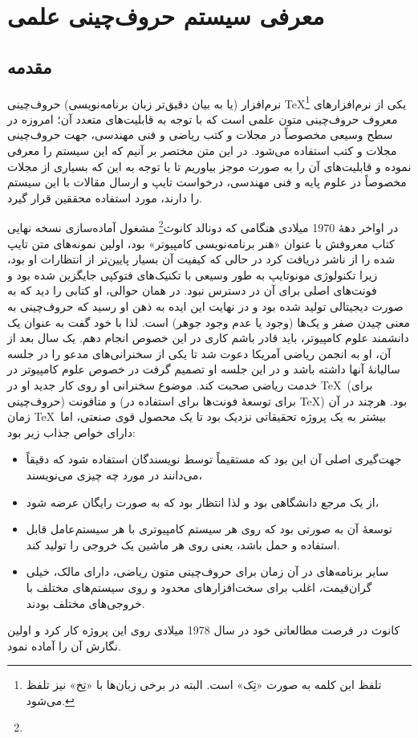 \chapter{معرفی سیستم حروف‌چینی علمی  \lr{\TeX}}
\section{مقدمه}
نرم‌افزار  (یا به بیان دقیق‌تر زبان برنامه‌نویسی) حروف‌چینی \TeX\footnote{تلفظ این کلمه به صورت «تِک» است. البته
در برخی زبان‌ها با «تِخ» نیز تلفظ می‌شود.}
یکی از نرم‌افزارهای معروف 
حروف‌چینی متون علمی است
که با توجه به قابلیت‌های متعدد آن؛ امروزه در سطح وسیعی مخصوصاً در مجلات و کتب ریاضی و فنی مهندسی، 
جهت حروف‌چینی  مجلات و کتب استفاده می‌شود.
 در این متن مختصر بر آنیم
که این سیستم را معرفی نموده و قابلیت‌های آن را به صورت موجز بیاوریم تا با توجه به این که بسیاری از مجلات
مخصوصاً در علوم پایه و فنی مهندسی، درخواست تایپ و ارسال مقالات با این سیستم را دارند، مورد استفاده 
محققین قرار گیرد.

در اواخر دهۀ 1970 میلادی هنگامی که دونالد کانوث\footnote{}
مشغول آماده‌سازی نسخه نهایی کتاب معروفش با عنوان «هنر برنامه‌نویسی کامپیوتر»
بود، اولین نمونه‌های متن تایپ شده را از ناشر دریافت کرد در حالی که کیفیت 
آن بسیار پایین‌تر از انتظارات او بود، زیرا تکنولوژی مونوتایپ 
به طور وسیعی با تکنیک‌های فتوکپی جایگزین شده بود و فونت‌های 
اصلی برای آن در دسترس نبود. در همان حوالی، او کتابی را دید که به صورت دیجیتالی
تولید شده بود و در نهایت این ایده به ذهن او رسید که حروف‌چینی به معنی چیدن صفر و
یک‌ها  (وجود یا عدم وجود جوهر)  است. لذا با خود گفت به عنوان یک دانشمند
علوم کامپیوتر، باید قادر باشم کاری در این خصوص انجام دهم. یک سال بعد از آن، او 
به انجمن ریاضی آمریکا دعوت شد تا یکی از سخنرانی‌های مدعو را در جلسه سالیانۀ
آنها داشته باشد و در این جلسه او تصمیم گرفت در خصوص علوم کامپیوتر در خدمت ریاضی
صحبت کند. موضوع سخنرانی او روی کار جدید او در \TeX\ (برای حروف‌چینی) 
و متافونت (برای توسعۀ فونت‌ها برای استفاده در \TeX)  بود.  هرچند در آن زمان
\TeX\ بیشتر به یک پروژه تحقیقاتی نزدیک بود تا یک محصول قوی صنعتی،
اما دارای خواص جذاب زیر بود:
\begin{itemize}
\item جهت‌گیری اصلی آن این بود که مستقیماً توسط نویسندگان استفاده شود که
دقیقاً می‌دانند در مورد چه چیزی می‌نویسند،
\item  از یک مرجع دانشگاهی بود و لذا انتظار بود که به صورت رایگان عرضه شود،
\item  توسعۀ آن به صورتی بود که روی هر سیستم کامپیوتری با هر سیستم‌عامل
قابل استفاده و حمل باشد، یعنی روی هر ماشین یک خروجی را تولید کند.
\item سایر برنامه‌های در آن زمان برای حروف‌چینی  متون ریاضی،  دارای مالک، خیلی
گران‌قیمت، اغلب برای سخت‌افزارهای محدود و روی سیستم‌های مختلف با خروجی‌های
مختلف بودند.
\end{itemize}
کانوث در فرصت مطالعاتی خود در سال 1978 میلادی روی این پروژه کار کرد و اولین
نگارش آن را آماده نمود. 

